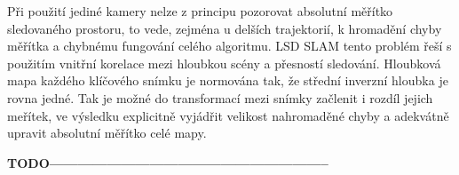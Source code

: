 \documentclass[12pt,a4paper]{article}
\begin{document}
Při použití jediné kamery nelze z principu pozorovat absolutní měřítko sledovaného prostoru, to vede, zejména u delších trajektorií, k hromadění chyby měřítka a chybnému fungování celého algoritmu. LSD SLAM tento problém řeší s použitím vnitřní korelace mezi hloubkou scény a přesností sledování. Hloubková mapa každého klíčového snímku je normována tak, že střední inverzní hloubka je rovna jedné. Tak je možné do transformací mezi snímky začlenit i rozdíl jejich meřítek, ve výsledku explicitně vyjádřit velikost nahromaděné chyby a adekvátně upravit absolutní měřítko celé mapy.



\textsf{\textbf{TODO-----------------------------------------------------------}}



\end{document}
